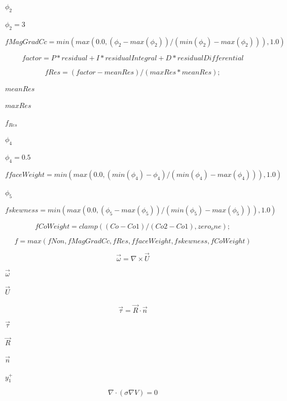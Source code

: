 \documentclass{article}
\begin{document}
$\phi_2$
\pagebreak

$\phi_2 = 3$
\pagebreak

\[
    fMagGradCc =
        min
        (
            max
            (
                0.0,
                (\phi_2 - max(\phi_2))
                / (min(\phi_2) - max(\phi_2))
            ),
            1.0
        )
\]
\pagebreak

\[
    factor =
        P*residual
        + I*residualIntegral
        + D*residualDifferential
\]
\pagebreak

\[
    fRes = (factor - meanRes)/(maxRes*meanRes);
\]
\pagebreak

$        meanRes $
\pagebreak

$        maxRes  $
\pagebreak

$f_{Res}$
\pagebreak

$\phi_4$
\pagebreak

$\phi_4 = 0.5$
\pagebreak

\[
        ffaceWeight = min
        (
            max
            (
                0.0,
                (min(\phi_4) - \phi_4)
                / (min(\phi_4) - max(\phi_4))
            ),
            1.0
        )
    \]
\pagebreak

$\phi_5$
\pagebreak

\[
        fskewness =
        min
        (
            max
            (
                0.0,
                (\phi_5    - max(\phi_5))
                / (min(\phi_5) - max(\phi_5))
            ),
            1.0
        )
    \]
\pagebreak

\[
        fCoWeight = clamp((Co - Co1)/(Co2 - Co1), zero_one{});
    \]
\pagebreak

\[
        f = max(fNon, fMagGradCc, fRes, ffaceWeight, fskewness, fCoWeight)
    \]
\pagebreak

\[
    \vec \omega = \nabla \times \vec U
\]
\pagebreak

$        \vec \omega   $
\pagebreak

$        \vec U        $
\pagebreak

\[
    \vec \tau = \vec R \cdot \vec n
\]
\pagebreak

$        \vec \tau   $
\pagebreak

$        \vec R $
\pagebreak

$        \vec n $
\pagebreak

$y_1^+$
\pagebreak

\[
    \nabla \cdot \left( \sigma \nabla V \right) = 0
\]
\pagebreak
\end{document}
